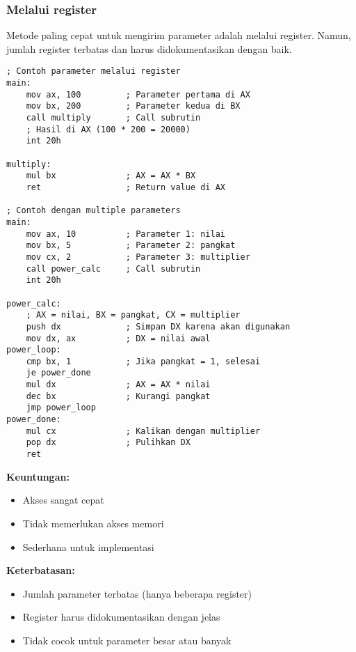 \documentclass[../main.tex]{subfiles}
\begin{document}
            \subsubsection{Melalui register}
                Metode paling cepat untuk mengirim parameter adalah melalui register. Namun, jumlah register terbatas dan harus didokumentasikan dengan baik.

                \begin{lstlisting}[language={[x86masm]Assembler}, caption=Parameter melalui Register, label={lst:param-register}]
; Contoh parameter melalui register
main:
    mov ax, 100         ; Parameter pertama di AX
    mov bx, 200         ; Parameter kedua di BX
    call multiply       ; Call subrutin
    ; Hasil di AX (100 * 200 = 20000)
    int 20h

multiply:
    mul bx              ; AX = AX * BX
    ret                 ; Return value di AX

; Contoh dengan multiple parameters
main:
    mov ax, 10          ; Parameter 1: nilai
    mov bx, 5           ; Parameter 2: pangkat
    mov cx, 2           ; Parameter 3: multiplier
    call power_calc     ; Call subrutin
    int 20h

power_calc:
    ; AX = nilai, BX = pangkat, CX = multiplier
    push dx             ; Simpan DX karena akan digunakan
    mov dx, ax          ; DX = nilai awal
power_loop:
    cmp bx, 1           ; Jika pangkat = 1, selesai
    je power_done
    mul dx              ; AX = AX * nilai
    dec bx              ; Kurangi pangkat
    jmp power_loop
power_done:
    mul cx              ; Kalikan dengan multiplier
    pop dx              ; Pulihkan DX
    ret
                \end{lstlisting}

                \textbf{Keuntungan:}
                \begin{itemize}
                    \item Akses sangat cepat
                    \item Tidak memerlukan akses memori
                    \item Sederhana untuk implementasi
                \end{itemize}

                \textbf{Keterbatasan:}
                \begin{itemize}
                    \item Jumlah parameter terbatas (hanya beberapa register)
                    \item Register harus didokumentasikan dengan jelas
                    \item Tidak cocok untuk parameter besar atau banyak
                \end{itemize}
\end{document}
